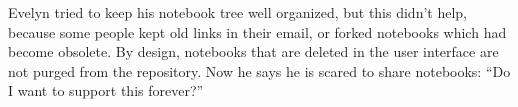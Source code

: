 Evelyn tried to keep his notebook tree well organized, but this didn't help,
because some people kept old links in their email, or forked notebooks which 
had become obsolete. By design, notebooks that are deleted in the user interface
are not purged from the repository. Now he says he is scared to share notebooks:
``Do I want to support this forever?''



